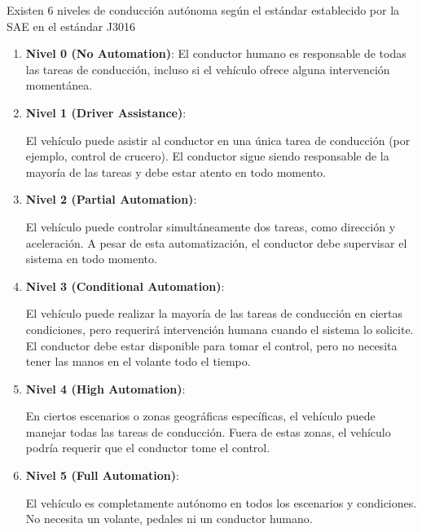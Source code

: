 \newpage



Existen 6 niveles de conducción autónoma según el estándar establecido por la \ac{SAE} en el estándar J3016 \cite{estándar-j3016}

\begin{enumerate}
        \item \textbf{Nivel 0 (No Automation)}:
         El conductor humano es responsable de todas las tareas de conducción, incluso si el vehículo ofrece alguna intervención momentánea.
        \bigskip

    \item \textbf{Nivel 1 (Driver Assistance)}:

        El vehículo puede asistir al conductor en una única tarea de conducción (por ejemplo, control de crucero).
        El conductor sigue siendo responsable de la mayoría de las tareas y debe estar atento en todo momento.
       \bigskip

    \item \textbf{Nivel 2 (Partial Automation)}:

         El vehículo puede controlar simultáneamente dos tareas, como dirección y aceleración.
         A pesar de esta automatización, el conductor debe supervisar el sistema en todo momento.
       \bigskip

    \item \textbf{Nivel 3 (Conditional Automation)}:

         El vehículo puede realizar la mayoría de las tareas de conducción en ciertas condiciones, pero requerirá intervención humana cuando el sistema lo solicite.
         El conductor debe estar disponible para tomar el control, pero no necesita tener las manos en el volante todo el tiempo.
       \bigskip

    \item \textbf{Nivel 4 (High Automation)}:

        En ciertos escenarios o zonas geográficas específicas, el vehículo puede manejar todas las tareas de conducción.
        Fuera de estas zonas, el vehículo podría requerir que el conductor tome el control.
      \bigskip

    \item \textbf{Nivel 5 (Full Automation)}:

        El vehículo es completamente autónomo en todos los escenarios y condiciones.
        No necesita un volante, pedales ni un conductor humano.
      \bigskip
\end{enumerate}

